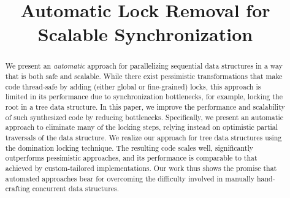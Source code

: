 \documentclass[preprint]{sigplanconf}
\begin{document}
\setlength{\pdfpageheight}{\paperheight}
\setlength{\pdfpagewidth}{\paperwidth}






\title{Automatic Lock Removal for Scalable Synchronization}

\authorinfo{}
           {}
           {}

\maketitle

\begin{abstract}
We present an \emph{automatic} approach for parallelizing sequential 
data structures in a way that is both safe and scalable. 
While there exist pessimistic transformations that make 
code thread-safe by adding (either global or fine-grained) locks, 
this approach is limited in its performance due to synchronization 
bottlenecks, for example, locking the root in a tree data structure. 
In this paper, we improve the performance and scalability of such 
synthesized code by reducing bottlenecks. Specifically, 
we present an automatic approach to eliminate many of the locking steps, 
relying instead on optimistic partial traversals of the data structure. 
We realize our approach for tree data structures using 
the domination locking technique. 
The resulting code scales well, significantly outperforms 
pessimistic approaches, and its performance is comparable 
to that achieved by custom-tailored implementations. 
Our work thus shows the promise that automated approaches 
bear for overcoming the difficulty involved in manually 
hand-crafting concurrent data structures. 

\end{abstract}
\end{document}
